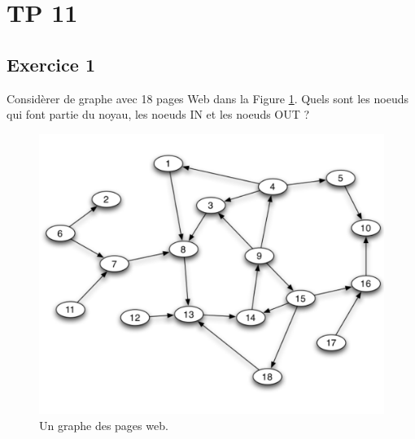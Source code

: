 \section{TP 11}









\subsection*{Exercice 1}
Considèrer de graphe avec 18 pages Web dans la Figure \ref{fig:webg}. Quels sont les noeuds qui font partie du noyau, les noeuds IN et les noeuds
OUT ?

    \begin{figure}[h!]
    \begin{center}
    \includegraphics[scale = 0.3]{figs/graph.png}
    \end{center}
    \caption{Un graphe des pages web.}
    \label{fig:webg}
    \end{figure}

